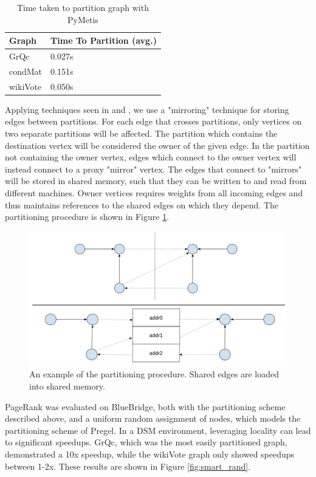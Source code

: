 \begin{table}[h]
\begin{tabularx}{\linewidth}{|X|X|}
\hline
Graph & Time To Partition (avg.) \\ \hline \hline
GrQc & 0.027s \\ \hline
condMat & 0.151s \\ \hline
wikiVote & 0.050s \\ \hline
\end{tabularx}
\label{table:part_time}
\caption{Time taken to partition graph with PyMetis}
\end{table}


Applying techniques seen in \cite{Chen:2015:powerlyra}
and \cite{Tian:2013:thinklikeagraph}, we use a "mirroring" technique for storing
edges between partitions. For each edge that crosses partitions, only vertices
on two separate partitions will be affected. The partition which contains the 
destination vertex will be considered the owner of the given edge. In the
partition not containing the owner vertex, edges which connect to the owner
vertex will instead connect to a proxy "mirror" vertex. The edges that connect
to "mirrors" will be stored in shared memory, such that they can be written to
and read from different machines. Owner vertices requires weights from all
incoming edges and thus maintains references to the shared edges on which they
depend. The partitioning procedure is shown in Figure \ref{fig:partition}.

\begin{figure}[h]
\includegraphics[width=\linewidth]{"fig/partition_example"}
\caption{An example of the partitioning procedure. Shared edges are loaded into
shared memory.}
\label{fig:partition}
\end{figure}

PageRank was evaluated on BlueBridge, both with the partitioning scheme
described above, and a uniform random assignment of nodes, which models the
partitioning scheme of Pregel. In a DSM environment, leveraging locality can
lead to significant speedups. GrQc, which was the most easily partitioned graph,
demonstrated a 10x speedup, while the wikiVote graph only showed speedups
between 1-2x. These results are shown in Figure \ref{fig:smart_rand}.

